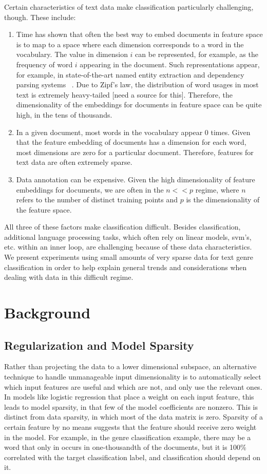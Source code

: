 \documentclass[]{article}
\begin{document}
Certain characteristics of text data make classification particularly challenging, though. These include:
\begin{enumerate}
\item Time has shown that often the best way to embed documents in feature space is to map to a space where each dimension corresponds to a word in the vocabulary. The value in dimension $i$ can be represented, for example, as the frequency of word $i$ appearing in the document. Such representations appear, for example, in state-of-the-art named entity extraction and dependency parsing systems ~\cite{ratinov2009design,nivre2004deterministic}. Due to Zipf's law, the distribution of word usages in most text is extremely heavy-tailed [need a source for this]. Therefore, the dimensionality of the embeddings for documents in feature space can be quite high, in the tens of thousands. 
\item  In a given document, most words in the vocabulary appear 0 times. Given that the feature embedding of documents has a dimension for each word, most dimensions are zero for a particular document. Therefore, features for text data are often extremely sparse. 
\item Data annotation can be expensive. Given the high dimensionality of feature embeddings for documents, we are often in the $n << p$ regime, where $n$ refers to the number of distinct training points and $p$ is the dimensionality of the feature space. 
\end{enumerate}

All three of these factors make classification difficult. Besides classification, additional language processing tasks, which often rely on linear models, svm's, etc. within an inner loop, are challenging because of these data characteristics.  We present experiments  using small amounts of very sparse data for text genre classification in order to help explain general trends and considerations when dealing with data in this difficult regime. 

\section{Background}

\subsection{Regularization and Model Sparsity}
	Rather than projecting the data to a lower dimensional subspace, an alternative technique to handle unmanageable input dimensionality is to automatically select which input features are useful and which are not, and only use the relevant ones. In models like logistic regression that place a weight on each input feature, this leads to model sparsity, in that few of the model coefficients are nonzero. This is distinct from data sparsity, in which most of the data matrix is zero. Sparsity of a certain feature by no means suggests that the feature should receive zero weight in the model. For example, in the genre classification example, there may be a word that only in occurs in one-thousandth of the documents, but it is 100\% correlated with the target classification label, and classification should depend on it. 
\end{document}
